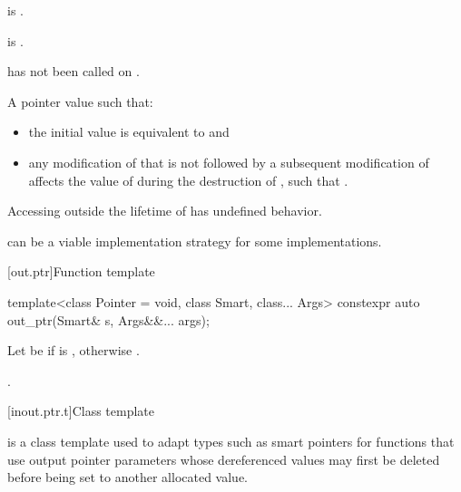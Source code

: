 \begin{itemdescr}
\pnum
\constraints
{} is .

\pnum
\mandates
{} is .

\pnum
\expects
{} has not been called on .

\pnum
\returns
A pointer value  such that:
\begin{itemize}
\item
the initial value  is equivalent to  and
\item
any modification of 
that is not followed by a subsequent modification of 
affects the value of  during the destruction of ,
such that .
\end{itemize}

\pnum
\remarks
Accessing  outside the lifetime of 
has undefined behavior.

\pnum
\begin{note}
can be a viable implementation strategy for some implementations.
\end{note}
\end{itemdescr}

[out.ptr]{Function template }

%
\begin{itemdecl}
template<class Pointer = void, class Smart, class... Args>
  constexpr auto out_ptr(Smart& s, Args&&... args);
\end{itemdecl}

\begin{itemdescr}
\pnum
Let  be 
if  is ,
otherwise .

\pnum
\returns
{}.
\end{itemdescr}

[inout.ptr.t]{Class template }

\pnum
{} is a class template used to adapt types
such as smart pointers
for functions that use output pointer parameters
whose dereferenced values may first be deleted
before being set to another allocated value.

